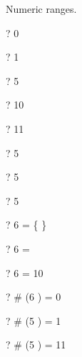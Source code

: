 \documentclass{article}
\begin{document}
Numeric ranges.
\begin{zed} \vdash?  0    \end{zed}
\begin{zed} \vdash?  1    \end{zed}
\begin{zed} \vdash?  5    \end{zed}
\begin{zed} \vdash?  10   \end{zed}
\begin{zed} \vdash?  11   \end{zed}
\begin{zed} \vdash?  5    \end{zed}
\begin{zed} \vdash?  5    \end{zed}
\begin{zed} \vdash?  5    \end{zed}
\begin{zed} \vdash?  6  = \{ \} \end{zed}
\begin{zed} \vdash?  6  = \emptyset \end{zed}
\begin{zed} \vdash?  6  = 10  \end{zed}
\begin{zed} \vdash?  \# (6 ) = 0 \end{zed}
\begin{zed} \vdash?  \# (5 ) = 1 \end{zed}
\begin{zed} \vdash?  \# (5 ) = 11 \end{zed}
\end{document}

